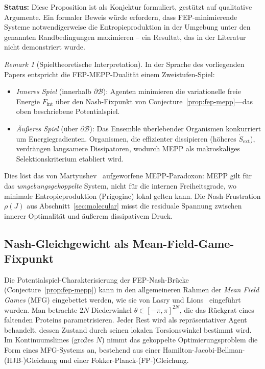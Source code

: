 \documentclass[12pt,a4paper]{article}
\theoremstyle{remark}
\newtheorem{remark}{Remark}
\begin{document}
\noindent\textbf{Status:} Diese Proposition ist als Konjektur formuliert, gest\"utzt auf qualitative Argumente. Ein formaler Beweis w\"urde erfordern, dass FEP-minimierende Systeme notwendigerweise die Entropieproduktion in der Umgebung unter den genannten Randbedingungen maximieren -- ein Resultat, das in der Literatur nicht demonstriert wurde.

\begin{remark}[Spieltheoretische Interpretation]
In der Sprache des vorliegenden Papers entspricht die FEP-MEPP-Dualit\"at einem Zweistufen-Spiel:
\begin{itemize}
  \item \emph{Inneres Spiel} (innerhalb $\partial\mathcal{B}$): Agenten minimieren die variationelle freie Energie $F_{\mathrm{int}}$ \"uber den Nash-Fixpunkt von Conjecture~\ref{prop:fep-mepp}---das oben beschriebene Potentialspiel.
  \item \emph{\"Au\ss{}eres Spiel} (\"uber $\partial\mathcal{B}$): Das Ensemble \"uberlebender Organismen konkurriert um Energiegradienten. Organismen, die effizienter dissipieren (h\"oheres $\dot{S}_{\mathrm{ext}}$), verdrängen langsamere Dissipatoren, wodurch MEPP als makroskaliges Selektionskriterium etabliert wird.
\end{itemize}
Dies l\"ost das von Martyushev~\cite{Martyushev2010} aufgeworfene MEPP-Paradoxon: MEPP gilt f\"ur das \emph{umgebungsgekoppelte} System, nicht f\"ur die internen Freiheitsgrade, wo minimale Entropieproduktion (Prigogine) lokal gelten kann. Die Nash-Frustration $\rho(J)$ aus Abschnitt~\ref{sec:molecular} misst die residuale Spannung zwischen innerer Optimalit\"at und \"au\ss{}erem dissipativem Druck.
\end{remark}

\subsection{Nash-Gleichgewicht als Mean-Field-Game-Fixpunkt}\label{sec:mfg-fixpoint}

Die Potentialspiel-Charakterisierung der FEP-Nash-Br\"ucke (Conjecture~\ref{prop:fep-mepp}) kann in den allgemeineren Rahmen der \emph{Mean Field Games} (MFG) eingebettet werden, wie sie von Lasry und Lions~\cite{LasryLions2007} eingef\"uhrt wurden. Man betrachte $2N$ Diederwinkel $\theta\in[-\pi,\pi]^{2N}$, die das R\"uckgrat eines faltenden Proteins parametrisieren. Jeder Rest wird als repr\"asentativer Agent behandelt, dessen Zustand durch seinen lokalen Torsionswinkel bestimmt wird. Im Kontinuumslimes (gro\ss{}es $N$) nimmt das gekoppelte Optimierungsproblem die Form eines MFG-Systems an, bestehend aus einer Hamilton-Jacobi-Bellman-(HJB-)Gleichung und einer Fokker-Planck-(FP-)Gleichung.
\end{document}
